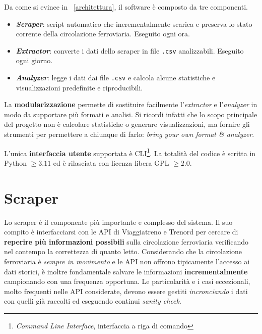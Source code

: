 \documentclass[12pt,italian]{report}
\begin{document}
Da come si evince in \figurename~\ref{architettura}, il software è
composto da tre componenti.
\begin{itemize}
    \item \textbf{\textit{Scraper}}: script automatico che
    incrementalmente scarica e preserva lo stato corrente della
    circolazione ferroviaria.  Eseguito ogni ora.
    \item \textbf{\textit{Extractor}}: converte i dati dello scraper
    in file \texttt{.csv} analizzabili.  Eseguito ogni giorno.
    \item \textbf{\textit{Analyzer}}: legge i dati dai file
    \texttt{.csv} e calcola alcune statistiche e visualizzazioni
    predefinite e riproducibili.
\end{itemize}

La \textbf{modularizzazione} permette di sostituire facilmente
l'\textit{extractor} e l'\textit{analyzer} in modo da supportare più
formati e analisi.  Si ricordi infatti che lo scopo principale del
progetto non è calcolare statistiche o generare visualizzazioni, ma
fornire gli strumenti per permettere a chiunque di farlo:
\textit{bring your own format \& analyzer}.

L'unica \textbf{interfaccia utente} supportata è
CLI\footnote{\textit{Command Line Interface}, interfaccia a riga di
    comando}.  La totalità del codice è scritta in Python $\geq 3.11$
ed è rilasciata con licenza libera GPL $\geq 2.0$.

\section{Scraper}

Lo scraper è il componente più importante e complesso del sistema.  Il
suo compito è interfacciarsi con le API di Viaggiatreno e Trenord per
cercare di \textbf{reperire più informazioni possibili} sulla
circolazione ferroviaria verificando nel contempo la correttezza di
quanto letto.  Considerando che la circolazione ferroviaria è
\textit{sempre in movimento} e le API non offrono tipicamente
l'accesso ai dati storici, è inoltre fondamentale salvare le
informazioni \textbf{incrementalmente} campionando con una frequenza
opportuna.
Le particolarità e i casi eccezionali, molto frequenti nelle API
considerate, devono essere gestiti \textit{incronciando} i dati con
quelli già raccolti ed eseguendo continui \textit{sanity check}.
\end{document}
